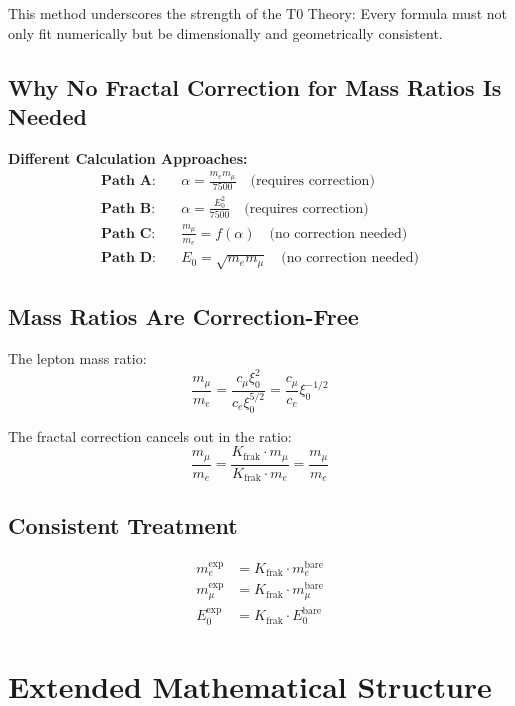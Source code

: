 \documentclass[12pt,a4paper]{article}
\newcommand{\xipar}{\xi_0}
\newcommand{\Kfrak}{K_{\text{frak}}}
\newcommand{\Ezero}{E_0}
\begin{document}
	This method underscores the strength of the T0 Theory: Every formula must not only fit numerically but be dimensionally and geometrically consistent.	
	\subsection{Why No Fractal Correction for Mass Ratios Is Needed}
	
	\begin{foundation}
		\textbf{Different Calculation Approaches:}
		\begin{align}
			\textbf{Path A:} &\quad \alpha = \frac{m_e m_\mu}{7500} \quad \text{(requires correction)} \\
			\textbf{Path B:} &\quad \alpha = \frac{\Ezero^2}{7500} \quad \text{(requires correction)} \\
			\textbf{Path C:} &\quad \frac{m_\mu}{m_e} = f(\alpha) \quad \text{(no correction needed)} \\
			\textbf{Path D:} &\quad \Ezero = \sqrt{m_e m_\mu} \quad \text{(no correction needed)}
		\end{align}
	\end{foundation}
	
	\subsection{Mass Ratios Are Correction-Free}
	
	The lepton mass ratio:
	\[
	\frac{m_\mu}{m_e} = \frac{c_\mu \xipar^2}{c_e \xipar^{5/2}} = \frac{c_\mu}{c_e} \xipar^{-1/2}
	\]
	
	The fractal correction cancels out in the ratio:
	\[
	\frac{m_\mu}{m_e} = \frac{\Kfrak \cdot m_\mu}{\Kfrak \cdot m_e} = \frac{m_\mu}{m_e}
	\]
	
	\subsection{Consistent Treatment}
	
	\begin{align}
		m_e^{\text{exp}} &= \Kfrak \cdot m_e^{\text{bare}} \\
		m_\mu^{\text{exp}} &= \Kfrak \cdot m_\mu^{\text{bare}} \\
		\Ezero^{\text{exp}} &= \Kfrak \cdot \Ezero^{\text{bare}}
	\end{align}
	
	\section{Extended Mathematical Structure}
	
\end{document}
